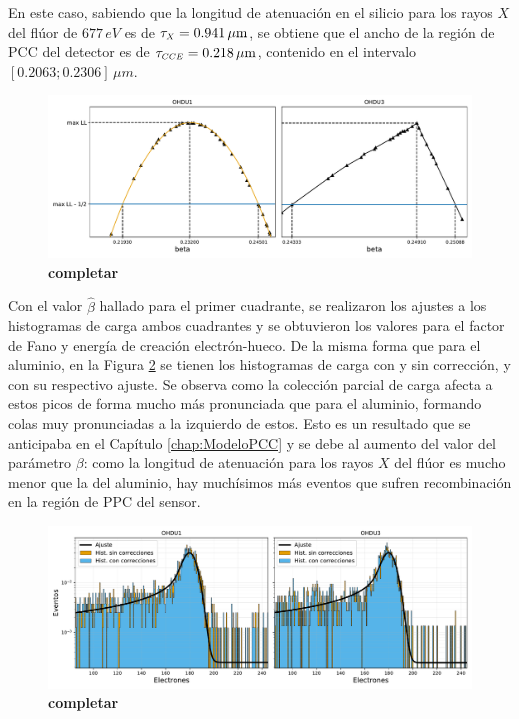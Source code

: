 En este caso, sabiendo que la longitud de atenuación en el silicio para los rayos $X$ del flúor de $677\,\si{eV}$ es de $\tau_{\scaleto{X}{4pt}} = 0.941\,\si{\mu m}$\cite{AttenuationLength}, se obtiene que el ancho de la región de PCC del detector es de $\tau_{\scaleto{CCE}{4pt}} = 0.218\,\si{\mu m}$, contenido en el intervalo $[0.2063; 0.2306]\,\si{\mu m}$.
\begin{figure}[h]
    \centering
    \includegraphics[scale=0.5]{Figs/F_barridos_beta.pdf}
    \caption{\footnotesize{\textbf{completar}}}
    \label{fig:F_barridos_beta}
\end{figure}
Con el valor $\hat{\beta}$ hallado para el primer cuadrante, se realizaron los ajustes a los histogramas de carga ambos cuadrantes y se obtuvieron los valores para el factor de Fano y energía de creación electrón-hueco. De la misma forma que para el aluminio, en la Figura \ref{fig:F_OHDU1y3_EPIX15conCorr} se tienen los histogramas de carga con y sin corrección, y con su respectivo ajuste. Se observa como la colección parcial de carga afecta a estos picos de forma mucho más pronunciada que para el aluminio, formando colas muy pronunciadas a la izquierdo de estos. Esto es un resultado que se anticipaba en el Capítulo \ref{chap:ModeloPCC} y se debe al aumento del valor del parámetro $\beta$: como la longitud de atenuación para los rayos $X$ del flúor es mucho menor que la del aluminio, hay muchísimos más eventos que sufren recombinación en la región de PPC del sensor. 
\begin{figure}[h]
    \centering
    \includegraphics[scale=0.5]{Figs/F_hists_ohdu1y3_dobles.pdf}
    \caption{\footnotesize{\textbf{completar}}}
    \label{fig:F_OHDU1y3_EPIX15conCorr}
\end{figure}
